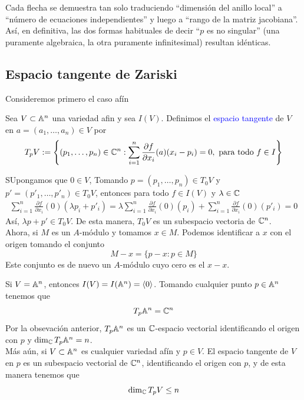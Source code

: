 Cada flecha se demuestra tan solo traduciendo “dimensión del anillo local” a “número de ecuaciones independientes” y luego a “rango de la matriz jacobiana”. Así, en definitiva, las dos formas habituales de decir “$p$ es no singular” (una puramente algebraica, la otra puramente infinitesimal) resultan idénticas.

\subsection{Espacio tangente de Zariski}
Consideremos primero el caso afín

\begin{definition}
    Sea $V\subset\mathbb{A}^n$ una variedad afin y sea $I(V)$. Definimos el \textcolor{blue}{espacio tangente} de $V$ en $a=(a_1,\dots,a_n)\in V$ por
    \begin{equation*}
        T_pV:=\left\{(p_1,\dots,p_n)\in\mathbb{C}^n:\sum_{i=1}^n\frac{\partial f}{\partial x_i}(a)(x_i-p_i)=0,\text{ para todo }f\in I \right\}
    \end{equation*}
\end{definition}

\begin{remark}
    SUpongamos que $0\in V$, Tomando $p=(p_1,\dots,p_n)\in T_0V$ y $p'=(p'_1,\dots,p'_n)\in T_0V$, entonces para todo $f\in I(V)$ y $\lambda\in\mathbb{C}$
    \begin{gather*}
        \sum_{i=1}^n\frac{\partial f}{\partial x_i}(0)(\lambda p_i+p'_i)=\lambda\sum_{i=1}^n\frac{\partial f}{\partial x_i}(0)(p_i) +\sum_{i=1}^n\frac{\partial f}{\partial x_i}(0)(p'_i)=0
    \end{gather*}
    Así, $\lambda p+p'\in T_0V$. De esta manera, $T_0V$ es un subespacio vectoria de $\mathbb{C}^n$.\\
    Ahora, si $M$ es un $A$-módulo y tomamos $x\in M$. Podemos identificar a $x$ con el origen tomando el conjunto
    \begin{equation*}
        M-x=\{p-x:p\in M\}
    \end{equation*}
    Este conjunto es de nuevo un $A$-módulo cuyo cero es el $x-x$. 
\end{remark}

\begin{example}
    Si $V=\mathbb{A}^n$, entonces $I(V)=I(\mathbb{A}^n)=\langle 0\rangle$. Tomando cualquier punto $p\in\mathbb{A}^n$ tenemos que
    \begin{equation*}
        T_p\mathbb{A}^n=\mathbb{C}^n
    \end{equation*}
    Por la obsevación anterior, $T_p\mathbb{A}^n$ es un $\mathbb{C}$-espacio vectorial identificando el origen con $p$ y $\dim_{\mathbb{C}} T_p\mathbb{A}^n=n$.\\
    Más aún, si $V\subset\mathbb{A}^n$ es cualquier variedad afín y $p\in V$. El espacio tangente de $V$ en $p$ es un subespacio vectorial de $\mathbb{C}^n$, identificando el origen con $p$, y de esta manera tenemos que
    \begin{equation*}
        \dim_{\mathbb{C}} T_p V\leq n
    \end{equation*}
\end{example}

